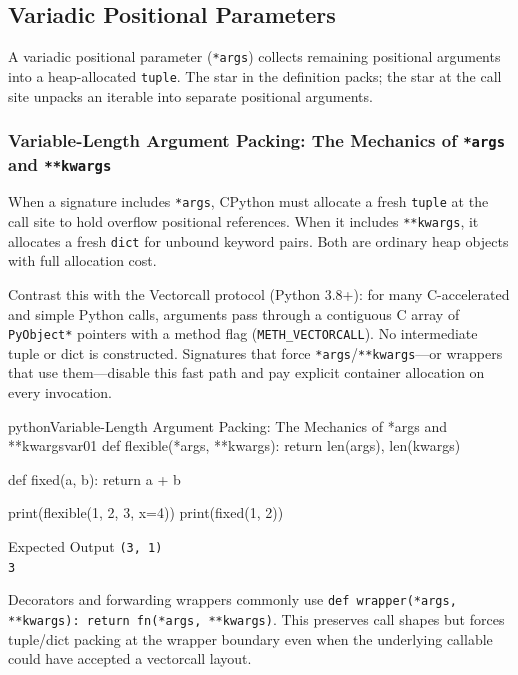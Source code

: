 \subsection{Variadic Positional Parameters}

A variadic positional parameter (\texttt{*args}) collects remaining positional arguments into a heap-allocated \texttt{tuple}. The star in the definition packs; the star at the call site unpacks an iterable into separate positional arguments.

\subsubsection{Variable-Length Argument Packing: The Mechanics of \texttt{*args} and \texttt{**kwargs}}

When a signature includes \texttt{*args}, CPython must allocate a fresh \texttt{tuple} at the call site to hold overflow positional references. When it includes \texttt{**kwargs}, it allocates a fresh \texttt{dict} for unbound keyword pairs. Both are ordinary heap objects with full allocation cost.

Contrast this with the Vectorcall protocol (Python 3.8+): for many C-accelerated and simple Python calls, arguments pass through a contiguous C array of \texttt{PyObject*} pointers with a method flag (\texttt{METH\_VECTORCALL}). No intermediate tuple or dict is constructed. Signatures that force \texttt{*args}/\texttt{**kwargs}---or wrappers that use them---disable this fast path and pay explicit container allocation on every invocation.

\begin{codebox}[]{python}{Variable-Length Argument Packing: The Mechanics of *args and **kwargs}{var01}
def flexible(*args, **kwargs):
    return len(args), len(kwargs)

def fixed(a, b):
    return a + b

print(flexible(1, 2, 3, x=4))
print(fixed(1, 2))
\end{codebox}


\begin{iobox}{Expected Output}
\texttt{(3, 1)} \\
\texttt{3} \\
\end{iobox}




Decorators and forwarding wrappers commonly use \texttt{def wrapper(*args, **kwargs): return fn(*args, **kwargs)}. This preserves call shapes but forces tuple/dict packing at the wrapper boundary even when the underlying callable could have accepted a vectorcall layout.

